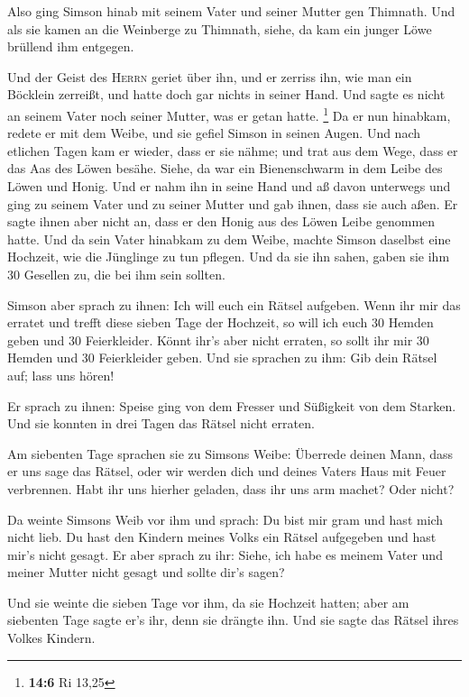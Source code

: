  Also ging Simson hinab mit seinem Vater und seiner Mutter
gen Thimnath. Und als sie kamen an die Weinberge zu Thimnath, siehe, da
kam ein junger Löwe brüllend ihm entgegen.

 Und der Geist des \textsc{Herrn} geriet über ihn, und er
zerriss ihn, wie man ein Böcklein zerreißt, und hatte doch gar nichts in
seiner Hand. Und sagte es nicht an seinem Vater noch seiner Mutter, was
er getan hatte. \footnote{\textbf{14:6} Ri 13,25}  Da er
nun hinabkam, redete er mit dem Weibe, und sie gefiel Simson in seinen
Augen.  Und nach etlichen Tagen kam er wieder, dass er sie
nähme; und trat aus dem Wege, dass er das Aas des Löwen besähe. Siehe,
da war ein Bienenschwarm in dem Leibe des Löwen und Honig.
 Und er nahm ihn in seine Hand und aß davon unterwegs und
ging zu seinem Vater und zu seiner Mutter und gab ihnen, dass sie auch
aßen. Er sagte ihnen aber nicht an, dass er den Honig aus des Löwen
Leibe genommen hatte.  Und da sein Vater hinabkam zu dem
Weibe, machte Simson daselbst eine Hochzeit, wie die Jünglinge zu tun
pflegen.  Und da sie ihn sahen, gaben sie ihm 30 Gesellen
zu, die bei ihm sein sollten.

 Simson aber sprach zu ihnen: Ich will euch ein Rätsel
aufgeben. Wenn ihr mir das erratet und trefft diese sieben Tage der
Hochzeit, so will ich euch 30 Hemden geben und 30 Feierkleider.
 Könnt ihr's aber nicht erraten, so sollt ihr mir 30
Hemden und 30 Feierkleider geben. Und sie sprachen zu ihm: Gib dein
Rätsel auf; lass uns hören!

 Er sprach zu ihnen: Speise ging von dem Fresser und
Süßigkeit von dem Starken. Und sie konnten in drei Tagen das Rätsel
nicht erraten.

 Am siebenten Tage sprachen sie zu Simsons Weibe:
Überrede deinen Mann, dass er uns sage das Rätsel, oder wir werden dich
und deines Vaters Haus mit Feuer verbrennen. Habt ihr uns hierher
geladen, dass ihr uns arm machet? Oder nicht?

 Da weinte Simsons Weib vor ihm und sprach: Du bist mir
gram und hast mich nicht lieb. Du hast den Kindern meines Volks ein
Rätsel aufgegeben und hast mir's nicht gesagt. Er aber sprach zu ihr:
Siehe, ich habe es meinem Vater und meiner Mutter nicht gesagt und
sollte dir's sagen?

 Und sie weinte die sieben Tage vor ihm, da sie Hochzeit
hatten; aber am siebenten Tage sagte er's ihr, denn sie drängte ihn. Und
sie sagte das Rätsel ihres Volkes Kindern.

